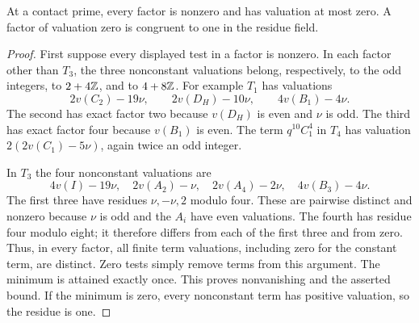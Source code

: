 \documentclass[11pt,a4paper]{article}
\begin{document}
\begin{lemma}\label{lem:residues}
At a contact prime, every factor is nonzero and has valuation at most
zero. A factor of valuation zero is congruent to one in the residue field.
\end{lemma}
\begin{proof}
First suppose every displayed test in a factor is nonzero. In each
factor other than $T_3$, the three nonconstant valuations belong,
respectively, to the odd integers, to $2+4\mathbb Z$, and to $4+8\mathbb Z$.
For example $T_1$ has valuations
\[
 2v(C_2)-19\nu,\qquad 2v(D_H)-10\nu,\qquad4v(B_1)-4\nu.
\]
The second has exact factor two because $v(D_H)$ is even and $\nu$ is
odd. The third has exact factor four because $v(B_1)$ is even.
The term $q^{10}C_1^4$ in $T_4$ has valuation
$2(2v(C_1)-5\nu)$, again twice an odd integer.

In $T_3$ the four nonconstant valuations are
\[
 4v(I)-19\nu,\quad 2v(A_2)-\nu,\quad
 2v(A_4)-2\nu,\quad4v(B_3)-4\nu.
\]
The first three have residues $\nu,-\nu,2$ modulo four. These are
pairwise distinct and nonzero because $\nu$ is odd and the $A_i$
have even valuations. The fourth has residue four modulo eight;
it therefore differs from each of the first three and from zero.
Thus, in every factor, all finite term valuations, including zero
for the constant term, are distinct. Zero tests simply remove terms
from this argument. The minimum is attained exactly once. This proves
nonvanishing and the asserted bound. If the minimum is zero, every
nonconstant term has positive valuation, so the residue is one.
\end{proof}
\end{document}
